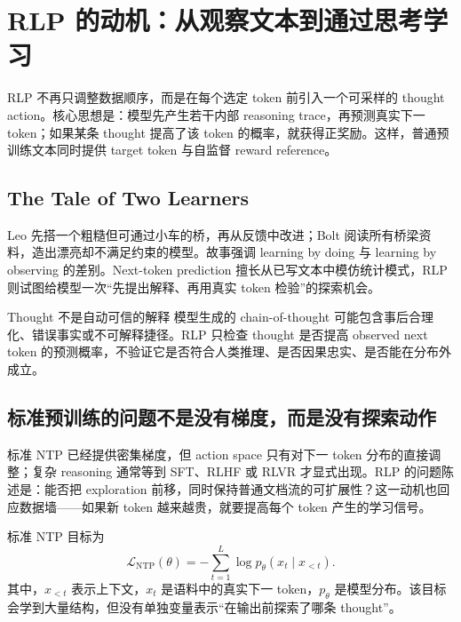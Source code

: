 \section{RLP 的动机：从观察文本到通过思考学习}

RLP 不再只调整数据顺序，而是在每个选定 token 前引入一个可采样的 thought action。核心思想是：模型先产生若干内部 reasoning trace，再预测真实下一 token；如果某条 thought 提高了该 token 的概率，就获得正奖励。这样，普通预训练文本同时提供 target token 与自监督 reward reference。

\subsection{The Tale of Two Learners}

Leo 先搭一个粗糙但可通过小车的桥，再从反馈中改进；Bolt 阅读所有桥梁资料，造出漂亮却不满足约束的模型。故事强调 learning by doing 与 learning by observing 的差别。Next-token prediction 擅长从已写文本中模仿统计模式，RLP 则试图给模型一次“先提出解释、再用真实 token 检验”的探索机会。


\begin{warningbox}{Thought 不是自动可信的解释}
模型生成的 chain-of-thought 可能包含事后合理化、错误事实或不可解释捷径。RLP 只检查 thought 是否提高 observed next token 的预测概率，不验证它是否符合人类推理、是否因果忠实、是否能在分布外成立。
\end{warningbox}

\subsection{标准预训练的问题不是没有梯度，而是没有探索动作}

标准 NTP 已经提供密集梯度，但 action space 只有对下一 token 分布的直接调整；复杂 reasoning 通常等到 SFT、RLHF 或 RLVR 才显式出现。RLP 的问题陈述是：能否把 exploration 前移，同时保持普通文档流的可扩展性？这一动机也回应数据墙——如果新 token 越来越贵，就要提高每个 token 产生的学习信号。


标准 NTP 目标为
\[
\mathcal{L}_{\mathrm{NTP}}(\theta)
=-\sum_{t=1}^{L}\log p_\theta(x_t\mid x_{<t}).
\]
其中，$x_{<t}$ 表示上下文，$x_t$ 是语料中的真实下一 token，$p_\theta$ 是模型分布。该目标会学到大量结构，但没有单独变量表示“在输出前探索了哪条 thought”。

